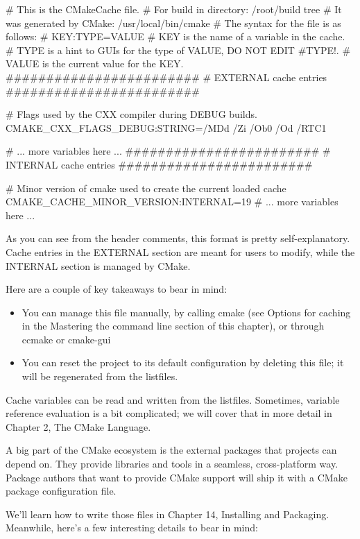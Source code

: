 \begin{shell}
# This is the CMakeCache file.
# For build in directory: /root/build tree
# It was generated by CMake: /usr/local/bin/cmake
# The syntax for the file is as follows:
# KEY:TYPE=VALUE
# KEY is the name of a variable in the cache.
# TYPE is a hint to GUIs for the type of VALUE, DO NOT EDIT
  #TYPE!.
# VALUE is the current value for the KEY.
########################
# EXTERNAL cache entries
########################

# Flags used by the CXX compiler during DEBUG builds.
CMAKE_CXX_FLAGS_DEBUG:STRING=/MDd /Zi /Ob0 /Od /RTC1

# ... more variables here ...
########################
# INTERNAL cache entries
########################

# Minor version of cmake used to create the current loaded cache
CMAKE_CACHE_MINOR_VERSION:INTERNAL=19
# ... more variables here ...
\end{shell}

As you can see from the header comments, this format is pretty self-explanatory. Cache entries in the EXTERNAL section are meant for users to modify, while the INTERNAL section is managed by CMake.

Here are a couple of key takeaways to bear in mind:

\begin{itemize}
\item
You can manage this file manually, by calling cmake (see Options for caching in the Mastering the command line section of this chapter), or through ccmake or cmake-gui

\item
You can reset the project to its default configuration by deleting this file; it will be regenerated from the listfiles.
\end{itemize}

Cache variables can be read and written from the listfiles. Sometimes, variable reference evaluation is a bit complicated; we will cover that in more detail in Chapter 2, The CMake Language.


A big part of the CMake ecosystem is the external packages that projects can depend on. They provide libraries and tools in a seamless, cross-platform way. Package authors that want to provide CMake support will ship it with a CMake package configuration file.

We’ll learn how to write those files in Chapter 14, Installing and Packaging. Meanwhile, here’s a few interesting details to bear in mind:

